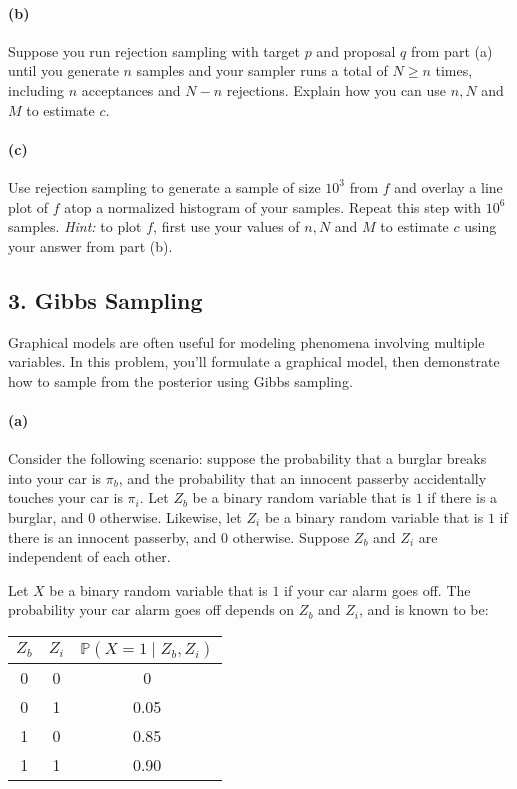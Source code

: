 \documentclass[a4paper,twoside,11pt]{article}
\begin{document}
\paragraph{(b)} Suppose you run rejection sampling with target $p$ and proposal $q$ from part (a) until you generate $n$ samples and your sampler runs a total of $N \ge n$ times, including $n$ acceptances and $N-n$ rejections. Explain how you can use $n, N$ and $M$ to estimate $c$.

\paragraph{(c)} Use rejection sampling to generate a sample of size $10^3$ from $f$ and overlay a line plot of $f$ atop a normalized histogram of your samples. Repeat this step with $10^6$ samples. {\sl Hint:} to plot $f$, first use your values of $n, N$ and $M$ to estimate $c$ using your answer from part (b).

\subsection*{3. Gibbs Sampling} Graphical models are often useful for modeling phenomena involving multiple variables. In this problem, you'll formulate a graphical model, then demonstrate how to sample from the posterior using Gibbs sampling. 

\paragraph{(a)} Consider the following scenario: suppose the probability that a burglar breaks into your car is $\pi_b$, and the probability that an innocent passerby accidentally touches your car is $\pi_i$. Let $Z_b$ be a binary random variable that is $1$ if there is a burglar, and $0$ otherwise. Likewise, let $Z_i$ be a binary random variable that is $1$ if there is an innocent passerby, and $0$ otherwise. Suppose $Z_b$ and $Z_i$ are independent of each other.
        
        Let $X$ be a binary random variable that is $1$ if your car alarm goes off. The probability your car alarm goes off depends on $Z_b$ and $Z_i$, and is known to be:
\begin{table}[h!]
        \centering
         \begin{tabular}{|c|c|c|} 
         \hline
          $Z_b$ & $Z_i$ & $\mathbb{P}(X = 1 \mid Z_b, Z_i)$\\ 
         \hline
         0 & 0 & 0\\
         \hline
         0 & 1 & 0.05\\
         \hline
         1 & 0 & 0.85\\
         \hline
         1 & 1 & 0.90 \\
         \hline
         \end{tabular}
\end{table} 
\end{document}
